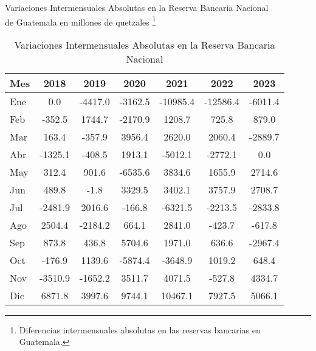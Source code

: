 \begin{table}[H]
\begin{center}
Variaciones Intermensuales Absolutas en la Reserva Bancaria Nacional \\
de Guatemala en millones de quetzales \footnote{Diferencias intermensuales absolutas en las reservas bancarias en Guatemala.}
\\
\begin{tabular}{
  @{}
  l
  S[table-format=-4.1]
  S[table-format=-4.1]
  S[table-format=-4.1]
  S[table-format=-4.1]
  S[table-format=-4.1]
  S[table-format=-4.1]
  @{}
}
\toprule
\textbf{Mes} & {\textbf{2018}} & {\textbf{2019}} & {\textbf{2020}} & {\textbf{2021}} & {\textbf{2022}} & {\textbf{2023}} \\
\midrule
Ene & 0.0 & -4417.0 & -3162.5 & -10985.4 & -12586.4 & -6011.4 \\
Feb & -352.5 & 1744.7 & -2170.9 & 1208.7 & 725.8 & 879.0 \\
Mar & 163.4 & -357.9 & 3956.4 & 2620.0 & 2060.4 & -2889.7 \\
Abr & -1325.1 & -408.5 & 1913.1 & -5012.1 & -2772.1 & 0.0 \\
May & 312.4 & 901.6 & -6535.6 & 3834.6 & 1655.9 & 2714.6 \\
Jun & 489.8 & -1.8 & 3329.5 & 3402.1 & 3757.9 & 2708.7 \\
Jul & -2481.9 & 2016.6 & -166.8 & -6321.5 & -2213.5 & -2833.8 \\
Ago & 2504.4 & -2184.2 & 664.1 & 2841.0 & -423.7 & -617.8 \\
Sep & 873.8 & 436.8 & 5704.6 & 1971.0 & 636.6 & -2967.4 \\
Oct & -176.9 & 1139.6 & -5874.4 & -3648.9 & 1019.2 & 648.4 \\
Nov & -3510.9 & -1652.2 & 3511.7 & 4071.5 & -527.8 & 4334.7 \\
Dic & 6871.8 & 3997.6 & 9744.1 & 10467.1 & 7927.5 & 5066.1 \\
\bottomrule
\end{tabular}
\end{center}
\caption{Variaciones Intermensuales Absolutas en la Reserva Bancaria Nacional}
\end{table}